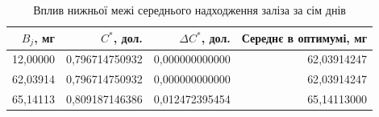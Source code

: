 \begin{table}[htbp]
\centering\small
\caption{Вплив нижньої межі середнього надходження заліза за сім днів}
\label{tab:glpk-multiday-iron}
\begin{tabular}{rrrr}
\toprule
$B_j$, мг & $C^*$, дол. & $\Delta C^*$, дол. & Середнє в оптимумі, мг \\
\midrule
12{,}00000 & 0{,}796714750932 & 0{,}000000000000 & 62{,}03914247 \\
62{,}03914 & 0{,}796714750932 & 0{,}000000000000 & 62{,}03914247 \\
65{,}14113 & 0{,}809187146386 & 0{,}012472395454 & 65{,}14113000 \\
\bottomrule
\end{tabular}
\end{table}
